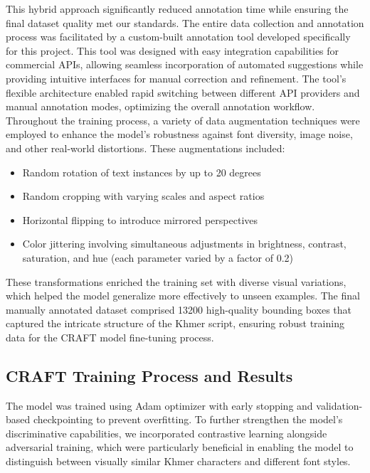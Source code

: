 This hybrid approach significantly 
reduced annotation time while ensuring the final dataset quality met our standards.
The entire data collection and annotation process was facilitated by a custom-built 
annotation tool developed specifically for this project. This tool was designed with 
easy integration capabilities for commercial APIs, allowing seamless incorporation of 
automated suggestions while providing intuitive interfaces for manual correction 
and refinement. The tool's flexible architecture enabled rapid switching between 
different API providers and manual annotation modes, optimizing the overall annotation 
workflow.
Throughout the training process, a variety of data augmentation techniques were 
employed to enhance the model's robustness against font diversity, image noise, 
and other real-world distortions. These augmentations included:

\begin{itemize}
\item Random rotation of text instances by up to 20 degrees
\item Random cropping with varying scales and aspect ratios
\item Horizontal flipping to introduce mirrored perspectives
\item Color jittering involving simultaneous adjustments in brightness, 
contrast, saturation, and hue (each parameter varied by a factor of 0.2)
\end{itemize}

These transformations enriched the training set with diverse visual variations, 
which helped the model generalize more effectively to unseen examples. The final 
manually annotated dataset comprised 13200 high-quality bounding boxes that captured 
the intricate structure of the Khmer script, ensuring robust training data for the 
CRAFT model fine-tuning process.



\subsection{CRAFT Training Process and Results}
\label{subsec:craft-training-results}

The model was trained using Adam optimizer with early stopping and validation-based checkpointing to prevent overfitting. To further strengthen the model's discriminative capabilities, we incorporated contrastive learning alongside adversarial training, which were particularly beneficial in enabling the model to distinguish between visually similar Khmer characters and different font styles.

